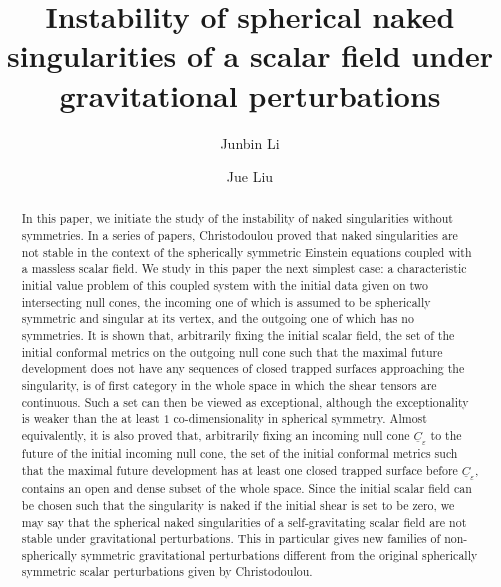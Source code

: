 \documentclass[11pt,reqno]{amsart}
\theoremstyle{definition}
\numberwithin{equation}{section}
\def\Cb{\underline{C}}
\begin{document}
\title[Instability of spherical naked singularities]{Instability of spherical naked singularities of a scalar field under gravitational perturbations}

\author[Junbin Li]{Junbin Li}
\address{Department of Mathematics, Sun Yat-sen University\\ Guangzhou, China}

\author[Jue Liu]{Jue Liu}
\address{Department of Mathematics, Sun Yat-sen University\\ Guangzhou, China}






\date{}

\maketitle


\begin{abstract}
In this paper, we initiate the study of the instability of naked singularities without symmetries. In a series of papers, Christodoulou proved that naked singularities are not stable in the context of the spherically symmetric Einstein equations coupled with a massless scalar field. We study in this paper the next simplest case: a characteristic initial value problem of this coupled system with the initial data given on two intersecting null cones, the incoming one of which is assumed to be spherically symmetric and singular at its vertex, and the outgoing one of which has no symmetries. It is shown that, arbitrarily fixing the initial scalar field, the set of the initial conformal metrics on the outgoing null cone such that the maximal future development does not have any sequences of closed trapped surfaces approaching the singularity, is of first category in the whole space in which the shear tensors are continuous. Such a set can then be viewed as exceptional, although the exceptionality is weaker than the at least $1$ co-dimensionality in spherical symmetry. Almost equivalently, it is also proved that, arbitrarily fixing an incoming null cone $\Cb_\varepsilon$ to the future of the initial incoming null cone, the set of the initial conformal metrics such that the maximal future development has at least one closed trapped surface before $\Cb_\varepsilon$, contains an open and dense subset of the whole space. Since the initial scalar field can be chosen such that the singularity is naked if the initial shear is set to be zero, we may say that the spherical naked singularities of a self-gravitating scalar field are not stable under gravitational perturbations. This in particular gives new families of non-spherically symmetric gravitational perturbations different from the original spherically symmetric scalar perturbations given by Christodoulou.


\end{abstract}
\end{document}
